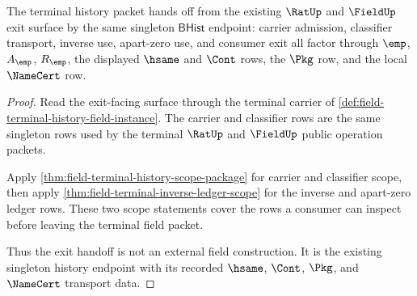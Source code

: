 \begin{theorem}
\label{thm:field-terminal-ratup-fieldup-exit-handoff}
The terminal history packet hands off from the existing $\RatUp$ and
$\FieldUp$ exit surface by the same singleton $\mathsf{BHist}$ endpoint:
carrier admission, classifier transport, inverse use, apart-zero use, and
consumer exit all factor through $\emp$, $A_{\emp}$, $R_{\emp}$, the displayed
$\hsame$ and $\Cont$ rows, the $\Pkg$ row, and the local $\NameCert$ row.
\end{theorem}
\begin{proof}
Read the exit-facing surface through the terminal carrier of
\autoref{def:field-terminal-history-field-instance}. The carrier and
classifier rows are the same singleton rows used by the terminal $\RatUp$ and
$\FieldUp$ public operation packets.

Apply \autoref{thm:field-terminal-history-scope-package} for carrier and
classifier scope, then apply
\autoref{thm:field-terminal-inverse-ledger-scope} for the inverse and
apart-zero ledger rows. These two scope statements cover the rows a consumer
can inspect before leaving the terminal field packet.

Thus the exit handoff is not an external field construction. It is the existing
singleton history endpoint with its recorded $\hsame$, $\Cont$, $\Pkg$, and
$\NameCert$ transport data.
\end{proof}
